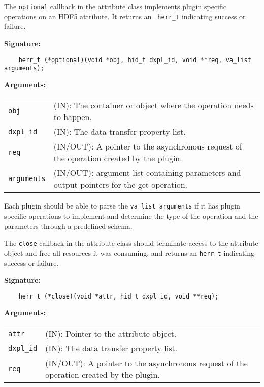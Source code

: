 The {\tt optional} callback in the attribute class implements plugin specific operations on an HDF5 attribute. It returns an {\tt
  herr\_t} indicating success or failure. 

\textbf{Signature:}
\begin{lstlisting}
    herr_t (*optional)(void *obj, hid_t dxpl_id, void **req, va_list arguments);
\end{lstlisting}

\textbf{Arguments:}\\
\begin{tabular}{l p{10cm}}
  {\tt obj} & (IN): The container or object where the operation needs to happen.\\
  {\tt dxpl\_id} & (IN): The data transfer property list.\\
  {\tt req} & (IN/OUT): A pointer to the asynchronous request of the operation created by the plugin.\\
  {\tt arguments} & (IN/OUT): argument list containing parameters and output pointers for the get operation. \\
\end{tabular}

Each plugin should be able to parse the {\tt va\_list arguments} if it has plugin specific operations to implement and determine the type of the operation and the parameters through a predefined schema. 

The {\tt close} callback in the attribute class should terminate
access to the attribute object and free all resources it was
consuming, and returns an {\tt herr\_t} indicating success or failure.

\textbf{Signature:}
\begin{lstlisting}
    herr_t (*close)(void *attr, hid_t dxpl_id, void **req);
\end{lstlisting}

\textbf{Arguments:}\\
\begin{tabular}{l p{10cm}}
  {\tt attr} & (IN): Pointer to the attribute object.\\
  {\tt dxpl\_id} & (IN): The data transfer property list.\\
  {\tt req} & (IN/OUT): A pointer to the asynchronous request of the
  operation created by the plugin.\\
\end{tabular}

